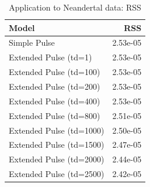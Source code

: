 \documentclass[11pt]{article}
\begin{document}
\begin{table}[H]

\caption{\label{tab:table_Supplements_Application_to_Neandertal_data_RSS}\label{tab:tableS1} Application to Neandertal data: RSS}
\centering
\begin{tabular}[t]{l|r}
\hline
Model & RSS\\
\hline
Simple Pulse & 2.53e-05\\
\cline{1-2}
Extended Pulse (td=1) & 2.53e-05\\
\cline{1-2}
Extended Pulse (td=100) & 2.53e-05\\
\cline{1-2}
Extended Pulse (td=200) & 2.53e-05\\
\cline{1-2}
Extended Pulse (td=400) & 2.53e-05\\
\cline{1-2}
Extended Pulse (td=800) & 2.51e-05\\
\cline{1-2}
Extended Pulse (td=1000) & 2.50e-05\\
\cline{1-2}
Extended Pulse (td=1500) & 2.47e-05\\
\cline{1-2}
Extended Pulse (td=2000) & 2.44e-05\\
\cline{1-2}
Extended Pulse (td=2500) & 2.42e-05\\
\hline
\end{tabular}
\end{table}
\end{document}
